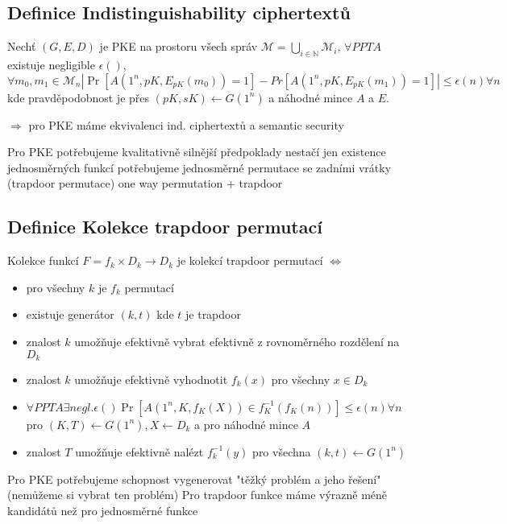 \documentclass{article}
\begin{document}
\subsection{Definice Indistinguishability ciphertextů}

Nechť $(G,E,D)$ je PKE na prostoru všech správ $\mathcal{M} = \bigcup_{i \in \mathbb{N}}\mathcal{M}_i$,
$\forall PPT A$ existuje negligible $\epsilon()$,
$$\forall m_0,m_1 \in \mathcal{M}_n |\Pr[A(1^n,pK, E_{pK}(m_0))=1]-Pr[A(1^n,pK,E_{pK}(m_1))=1]| \le \epsilon(n) \forall n$$
kde pravděpodobnost je přes $(pK,sK) \leftarrow G(1^n)$ a náhodné mince $A$ a $E$.


$\Rightarrow$ pro PKE máme ekvivalenci ind. ciphertextů a semantic security



Pro PKE potřebujeme kvalitativně silnější předpoklady
    nestačí jen existence jednosměrných funkcí
    potřebujeme jednosměrné permutace se zadními vrátky (trapdoor permutace)
        one way permutation + trapdoor


\subsection{Definice Kolekce trapdoor permutací}
Kolekce funkcí $F = {f_k \times D_k \rightarrow D_k}$ je kolekcí trapdoor permutací $\iff$
\begin{itemize}
\item pro všechny $k$ je $f_k$ permutací
\item existuje generátor $(k,t)$ kde $t$ je trapdoor
\item znalost $k$ umožňuje efektivně vybrat efektivně z rovnoměrného rozdělení na $D_k$
\item znalost $k$ umožňuje efektivně vyhodnotit $f_k(x)$ pro všechny $x \in D_k$
\item $\forall PPT A \exists negl. \epsilon() \Pr[A(1^n,K,f_K(X)) \in f_K^{-1}(f_K(n))] \le \epsilon(n) \forall n$
    pro $(K,T) \leftarrow G(1^n), X \leftarrow D_k$ a pro náhodné mince $A$

\item znalost $T$ umožňuje efektivně nalézt $f_k^{-1}(y)$ pro všechna $(k,t) \leftarrow G(1^n)$
\end{itemize}

Pro PKE potřebujeme schopnost vygenerovat "těžký problém a jeho řešení"
(nemůžeme si vybrat ten problém)
Pro trapdoor funkce máme výrazně méně kandidátů než pro jednosměrné funkce
\end{document}
